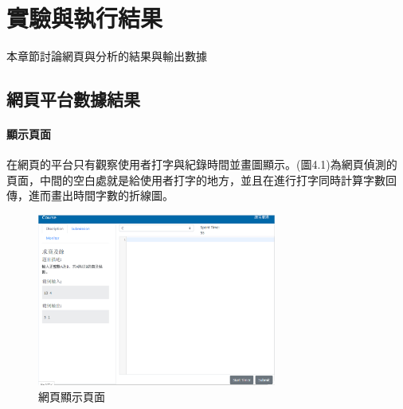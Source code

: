 \chapter{實驗與執行結果}
本章節討論網頁與分析的結果與輸出數據
\section{網頁平台數據結果}
\subsubsection{顯示頁面}
在網頁的平台只有觀察使用者打字與紀錄時間並畫圖顯示。(圖4.1)為網頁偵測的頁面，中間的空白處就是給使用者打字的地方，並且在進行打字同時計算字數回傳，進而畫出時間字數的折線圖。
	\begin{figure}[H] 
	\centering 
	\includegraphics[width=0.7\textwidth]{web_part.png} 
	\caption{網頁顯示頁面} 
	\label{Fig.4.1} 
	\end{figure}
